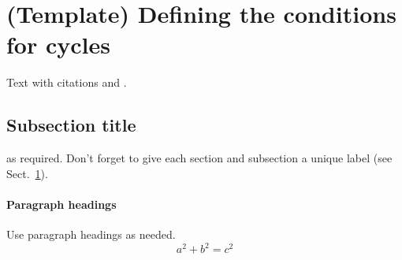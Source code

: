 \section{(Template) Defining the conditions for cycles}
\label{sec:1}
Text with citations \cite{RefB} and \cite{RefJ}.
\subsection{Subsection title}
\label{sec:2}
as required. Don't forget to give each section
and subsection a unique label (see Sect.~\ref{sec:1}).
\paragraph{Paragraph headings} Use paragraph headings as needed.
\begin{equation}
a^2+b^2=c^2
\end{equation}





%
%



